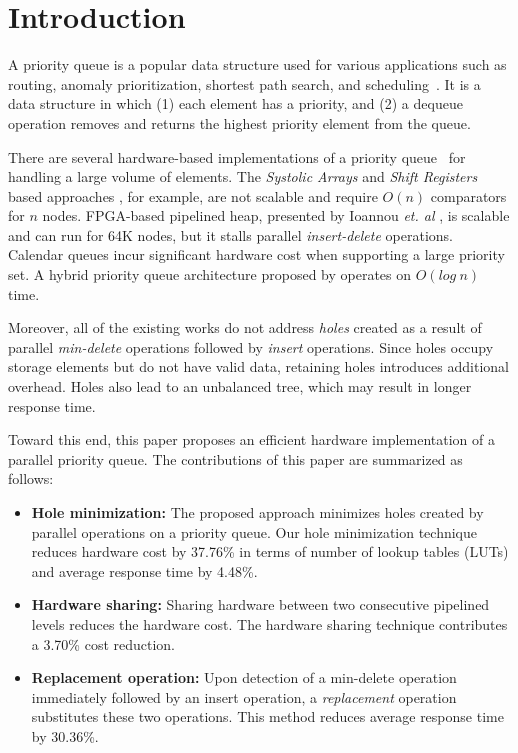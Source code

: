 \section{Introduction}
A priority queue is a popular data structure used for various applications such as routing, anomaly prioritization, shortest path search, and scheduling~\cite{ah1,ah2,ah3}.
It is a data structure in which (1) each element has a priority, and (2) a dequeue operation removes and returns the highest priority element from the queue.

There are several hardware-based implementations of a priority queue~\cite{hw1,hw2,hw8,hw9,fpga1,fpga2,fpga3} for handling a large volume of elements.
The {\it Systolic Arrays} and {\it Shift Registers} based approaches \cite{hw8,hw9}, for example, are not scalable and require $O(n)$ comparators for $n$ nodes.
FPGA-based pipelined heap, presented by Ioannou {\it et. al} \cite{fpga1}, is scalable and can run for 64K nodes, but it stalls parallel {\it insert-delete} operations. Calendar queues \cite{hw1} incur significant hardware cost when supporting a large priority set. A hybrid priority queue architecture proposed by \cite{hwsw1} operates on $O(log \ n)$ time.

Moreover, all of the existing works do not address {\it holes} created as a result of parallel {\it min-delete} operations followed by {\it insert} operations.
Since holes occupy storage elements but do not have valid data, retaining holes introduces additional overhead.
Holes also lead to an unbalanced tree, which may result in longer response time.

Toward this end, this paper proposes an efficient hardware implementation of a parallel priority queue.
The contributions of this paper are summarized as follows:
\begin{itemize}
\item {\bf Hole minimization:} The proposed approach minimizes holes created by parallel operations on a priority queue. Our hole minimization technique reduces hardware cost by 37.76\% in terms of number of lookup tables (LUTs) and average response time by 4.48\%.
\item {\bf Hardware sharing:} Sharing hardware between two consecutive pipelined levels reduces the hardware cost. The hardware sharing technique contributes a 3.70\% cost reduction.
\item {\bf Replacement operation:} Upon detection of a min-delete operation immediately followed by an insert operation, a {\it replacement} operation substitutes these two operations. This method reduces average response time by 30.36\%.
\end{itemize}

